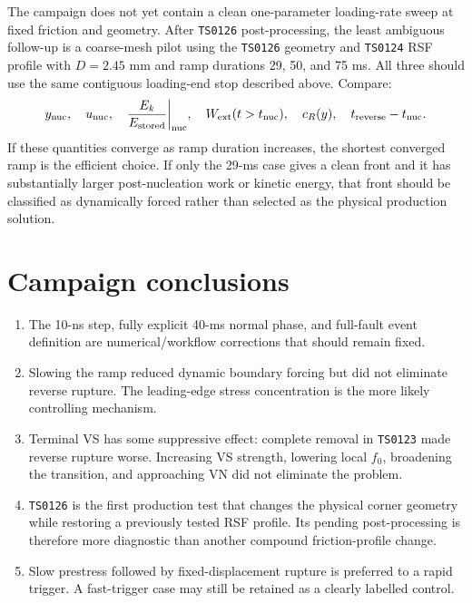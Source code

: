 \documentclass[11pt]{article}
\newcommand{\run}[1]{\texttt{TS#1}}
\begin{document}
The campaign does not yet contain a clean one-parameter loading-rate sweep at
fixed friction and geometry.  After \run{0126} post-processing, the least
ambiguous follow-up is a coarse-mesh pilot using the \run{0126} geometry and
\run{0124} RSF profile with $D=2.45$ mm and ramp durations 29, 50, and 75 ms.
All three should use the same contiguous loading-end stop described above.
Compare:
\begin{equation}
  y_{\rm nuc},\quad u_{\rm nuc},\quad
  \frac{E_k}{E_{\rm stored}}\bigg|_{\rm nuc},\quad
  W_{\rm ext}(t>t_{\rm nuc}),\quad
  c_R(y),\quad t_{\rm reverse}-t_{\rm nuc}.
\end{equation}
If these quantities converge as ramp duration increases, the shortest
converged ramp is the efficient choice.  If only the 29-ms case gives a clean
front and it has substantially larger post-nucleation work or kinetic energy,
that front should be classified as dynamically forced rather than selected as
the physical production solution.

\section{Campaign conclusions}

\begin{enumerate}
  \item The 10-ns step, fully explicit 40-ms normal phase, and full-fault event
  definition are numerical/workflow corrections that should remain fixed.
  \item Slowing the ramp reduced dynamic boundary forcing but did not eliminate
  reverse rupture.  The leading-edge stress concentration is the more likely
  controlling mechanism.
  \item Terminal VS has some suppressive effect: complete removal in
  \run{0123} made reverse rupture worse.  Increasing VS strength, lowering
  local $f_0$, broadening the transition, and approaching VN did not eliminate
  the problem.
  \item \run{0126} is the first production test that changes the physical
  corner geometry while restoring a previously tested RSF profile.  Its
  pending post-processing is therefore more diagnostic than another compound
  friction-profile change.
  \item Slow prestress followed by fixed-displacement rupture is preferred to
  a rapid trigger.  A fast-trigger case may still be retained as a clearly
  labelled control.
\end{enumerate}
\end{document}
